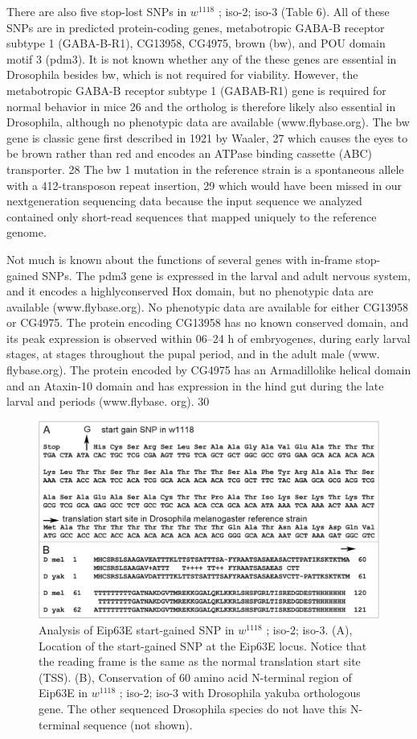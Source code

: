 There are also five stop-lost SNPs in $w^{1118}$ ; iso-2; iso-3 (Table 6). All of these SNPs are in predicted protein-coding genes, metabotropic GABA-B receptor subtype 1 (GABA-B-R1), CG13958, CG4975, brown (bw), and POU domain motif 3 (pdm3). It is not known whether any of the these genes are essential in Drosophila besides bw, which is not required for viability.  However, the metabotropic GABA-B receptor subtype 1 (GABAB-R1) gene is required for normal behavior in mice 26 and the ortholog is therefore likely also essential in Drosophila, although no phenotypic data are available (www.flybase.org). The bw gene is classic gene first described in 1921 by Waaler, 27 which causes the eyes to be brown rather than red and encodes an ATPase binding cassette (ABC) transporter. 28 The bw 1 mutation in the reference strain is a spontaneous allele with a 412-transposon repeat insertion, 29 which would have been missed in our nextgeneration sequencing data because the input sequence we analyzed contained only short-read sequences that mapped uniquely to the reference genome.

Not much is known about the functions of several genes with in-frame stop-gained SNPs. The pdm3 gene is expressed in the larval and adult nervous system, and it encodes a highlyconserved Hox domain, but no phenotypic data are available (www.flybase.org). No phenotypic data are available for either CG13958 or CG4975. The protein encoding CG13958 has no known conserved domain, and its peak expression is observed within 06–24 h of embryogenes, during early larval stages, at stages throughout the pupal period, and in the adult male (www.  flybase.org). The protein encoded by CG4975 has an Armadillolike helical domain and an Ataxin-10 domain and has expression in the hind gut during the late larval and periods (www.flybase.  org). 30

\begin{figure}
    \centering
    \includegraphics[width=14cm]{snpeff_fig2.png}
    \caption{Analysis of Eip63E start-gained SNP in $w^{1118}$ ; iso-2; iso-3. (A), Location of the start-gained SNP at the Eip63E locus. Notice that the reading frame is the same as the normal translation start site (TSS). (B), Conservation of 60 amino acid N-terminal region of Eip63E in $w^{1118}$ ; iso-2; iso-3 with Drosophila yakuba orthologous gene. The other sequenced Drosophila species do not have this N-terminal sequence (not shown).}
    \label{fig:snpeffTab3}
\end{figure}

